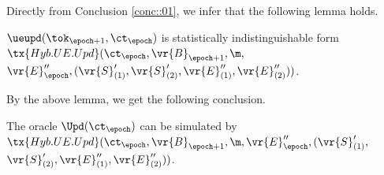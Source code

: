 \documentclass{fundam}
\begin{document}

\vspace{1cm}

\noindent Directly from Conclusion \ref{conc::01}, we infer that the following lemma holds.
\begin{lemma}
	$\ueupd( \tok_{\epoch+1}, \ct_{\epoch})$ is statistically indistinguishable form $\tx{Hyb.UE.Upd}(\ct_{\epoch}, \vr{B}_{\epoch+1},\m,$ $ \vr{E}_{\epoch}'', (\vr{S}_{(1)}', \vr{S}_{(2)}', \vr{E}_{(1)}'', \vr{E}_{(2)}''))$.	
\end{lemma}	

\noindent By the above lemma, we get the following conclusion. 

\begin{concl}\label{conc::02}
	The oracle $\Upd(\ct_{\epoch})$ can be simulated by $\tx{Hyb.UE.Upd}(\ct_{\epoch}, \vr{B}_{\epoch+1},\m, \vr{E}_{\epoch}'', (\vr{S}_{(1)}',$ $\vr{S}_{(2)}', \vr{E}_{(1)}'', \vr{E}_{(2)}''))$.	
\end{concl}
\end{document}
